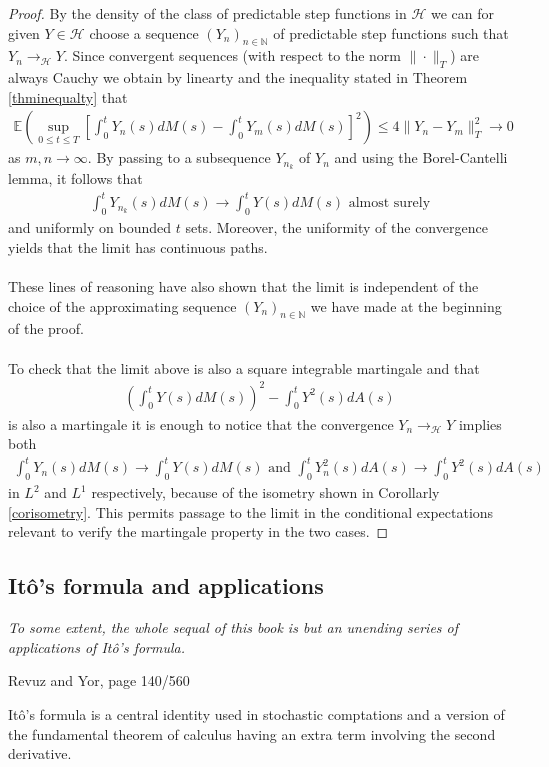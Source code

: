 \documentclass[11pt,a4paper, final]{article}
\begin{document}
\begin{proof}
By the density of the class of predictable step functions in $\mathcal{H}$ we can  for given $Y \in \mathcal{H}$ choose a sequence $(Y_n)_{n \in \mathbb{N}}$ of predictable step functions such that $Y_n \to_\mathcal{H} Y$. Since convergent sequences (with respect to the norm $\| \cdot \|_T$) are always Cauchy we obtain by linearty and the inequality stated in Theorem \ref{thminequalty} that
\begin{align*}
\mathbb{E} \left( \sup_{0 \leq t \leq T} \left[ \int_0^t Y_n(s) dM(s) - \int_0^t Y_m(s) dM(s) \right]^2 \right) \leq 4 \| Y_n -Y_m \|_T^2 \to 0 
\end{align*}
as $m,n \to \infty$. By passing to a subsequence $Y_{n_k}$ of $Y_n$ and using the Borel-Cantelli lemma, it follows that \begin{align*}
\int_0^t Y_{n_k} (s) dM(s) \to \int_0^t Y(s) dM(s) \text{ almost surely}
\end{align*}
and uniformly on bounded $t$ sets. Moreover, the uniformity of the convergence yields that the limit has continuous paths. 
\\\\
These lines of reasoning have also shown that the limit is independent of the choice of the approximating sequence $(Y_n)_{n \in \mathbb{N}}$ we have made at the beginning of the proof. 
\\\\
To check that the limit above is also a square integrable martingale and that 
\begin{align*}
\left( \int_0^t Y(s) dM(s) \right)^2 - \int_0^t Y^2(s) dA(s)
\end{align*}
is also a martingale it is enough to notice that the convergence $Y_n \to_\mathcal{H} Y$ implies both
\begin{align*}
\int_0^t Y_n(s) dM(s) \to \int_0^t Y(s) dM(s) \text{ and } \int_0^t Y_n^2(s)dA(s) \to \int_0^t Y^2(s) dA(s)
\end{align*}
in $L^2$ and $L^1$ respectively, because of the isometry shown in Corollarly \ref{corisometry}. This permits passage to the limit in the conditional expectations relevant to verify the martingale property in the two cases. 
\end{proof}
\newpage
\subsection{Itô's formula and applications}
\epigraph{\textit{To some extent, the whole sequal of this book is but an unending series of applications of Itô's formula.}}{Revuz and Yor, page 140/560}
\noindent Itô's formula is a central identity used in stochastic comptations and a version of the fundamental theorem of calculus having an extra term involving the second derivative. 
\end{document}
